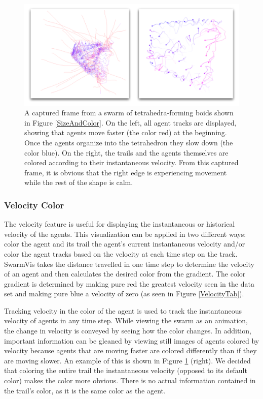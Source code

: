 \documentclass[conference]{IEEEtran}
\begin{document}
\begin{figure}
\centering
\includegraphics[scale=.33]{images/velocity.pdf}
\caption{
A captured frame from a swarm of tetrahedra-forming boids shown in Figure \ref{SizeAndColor}.
On the left, all agent tracks are displayed, showing that agents move faster (the color red) at the beginning.
Once the agents organize into the tetrahedron they slow down (the color blue).
On the right, the trails and the agents themselves are colored according to their instantaneous velocity.
From this captured frame, it is obvious that the right edge is experiencing movement while the rest of the
shape is calm. }
\label{Velocity}
\end{figure}

\subsubsection{Velocity Color}

The velocity feature is useful for displaying the instantaneous or historical velocity of the agents.
This visualization can be applied in two different ways: color the agent and its trail the agent's current instantaneous
velocity and/or color the agent tracks based on the velocity at each time step on the track.
SwarmVis takes the distance travelled in one time step to determine the velocity of an agent and then calculates the 
desired color from the gradient.
The color gradient is determined by making pure red the greatest velocity seen in the data set and making pure blue
a velocity of zero (as seen in Figure \ref{VelocityTab}).

Tracking velocity in the color of the agent is used to track the instantaneous velocity of agents in any time step.
While viewing the swarm as an animation, the change in velocity is conveyed by seeing how the color changes.
In addition, important information can be gleaned by viewing still images of agents colored by velocity because
agents that are moving faster are colored differently than if they are moving slower.
An example of this is shown in Figure \ref{Velocity} (right).
We decided that coloring the entire trail the instantaneous velocity (opposed to its default color)
makes the color more obvious.
There is no actual information contained in the trail's color, as it is the same color as the agent.
\end{document}
